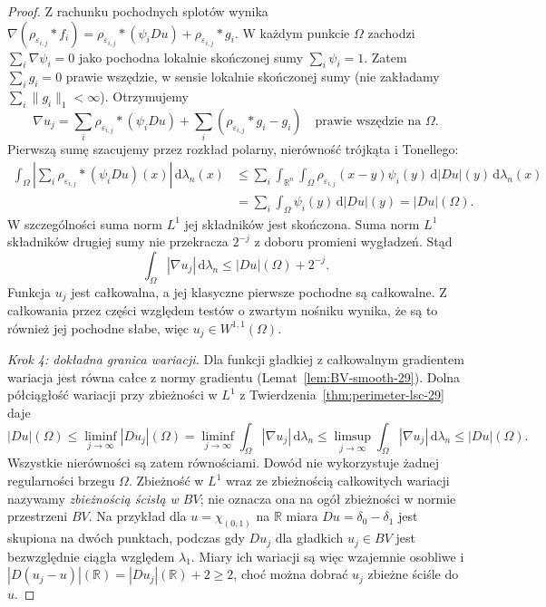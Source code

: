 \begin{proof}
Z rachunku pochodnych splotów wynika
$\nabla(\rho_{\varepsilon_{i,j}}*f_i)
=\rho_{\varepsilon_{i,j}}*(\psi_i Du)
+\rho_{\varepsilon_{i,j}}*g_i$.
W każdym punkcie $\Omega$ zachodzi
$\sum_i\nabla\psi_i=0$ jako pochodna lokalnie
skończonej sumy $\sum_i\psi_i=1$.
Zatem $\sum_i g_i=0$ prawie wszędzie, w sensie
lokalnie skończonej sumy (nie zakładamy
$\sum_i\|g_i\|_1<\infty$).
Otrzymujemy
\[
 \nabla u_j
 =\sum_i\rho_{\varepsilon_{i,j}}*(\psi_i Du)
 +\sum_i(\rho_{\varepsilon_{i,j}}*g_i-g_i)
 \quad\text{prawie wszędzie na }\Omega.
\]
Pierwszą sumę szacujemy przez rozkład polarny,
nierówność trójkąta i Tonellego:
\begin{align*}
 \int_\Omega\left|\sum_i
 \rho_{\varepsilon_{i,j}}*(\psi_i Du)(x)\right|
 \,\mathrm d\lambda_n(x)
 &\le\sum_i\int_{\mathbb R^n}\int_\Omega
 \rho_{\varepsilon_{i,j}}(x-y)\psi_i(y)
 \,\mathrm d|Du|(y)\,\mathrm d\lambda_n(x)\\
 &=\sum_i\int_\Omega\psi_i(y)\,\mathrm d|Du|(y)
 =|Du|(\Omega).
\end{align*}
W szczególności suma norm $L^1$ jej składników
jest skończona. Suma norm $L^1$ składników
drugiej sumy nie przekracza $2^{-j}$ z doboru
promieni wygładzeń. Stąd
\[
 \int_\Omega|\nabla u_j|\,\mathrm d\lambda_n
 \le |Du|(\Omega)+2^{-j}.
\]
Funkcja $u_j$ jest całkowalna, a jej klasyczne
pierwsze pochodne są całkowalne. Z całkowania
przez części względem testów o zwartym nośniku
wynika, że są to również jej pochodne słabe,
więc $u_j\in W^{1,1}(\Omega)$.

\emph{Krok 4: dokładna granica wariacji.}
Dla funkcji gładkiej z całkowalnym gradientem
wariacja jest równa całce z normy gradientu
(Lemat~\ref{lem:BV-smooth-29}).
Dolna półciągłość wariacji przy zbieżności
w $L^1$ z Twierdzenia~\ref{thm:perimeter-lsc-29}
daje
\[
 |Du|(\Omega)
 \le\liminf_{j\to\infty}|Du_j|(\Omega)
 =\liminf_{j\to\infty}\int_\Omega|\nabla u_j|
 \,\mathrm d\lambda_n
 \le\limsup_{j\to\infty}\int_\Omega|\nabla u_j|
 \,\mathrm d\lambda_n
 \le|Du|(\Omega).
\]
Wszystkie nierówności są zatem równościami.
Dowód nie wykorzystuje żadnej regularności
brzegu $\Omega$. Zbieżność w $L^1$ wraz ze
zbieżnością całkowitych wariacji nazywamy
\emph{zbieżnością ścisłą w $BV$}; nie oznacza
ona na ogół zbieżności w normie przestrzeni $BV$.
Na przykład dla $u=\chi_{(0,1)}$ na $\mathbb R$
miara $Du=\delta_0-\delta_1$ jest skupiona
na dwóch punktach, podczas gdy $Du_j$ dla
gładkich $u_j\in BV$ jest bezwzględnie ciągła
względem $\lambda_1$. Miary ich wariacji
są więc wzajemnie osobliwe i
$|D(u_j-u)|(\mathbb R)=|Du_j|(\mathbb R)+2\ge2$,
choć można dobrać $u_j$ zbieżne ściśle do $u$.
\end{proof}

